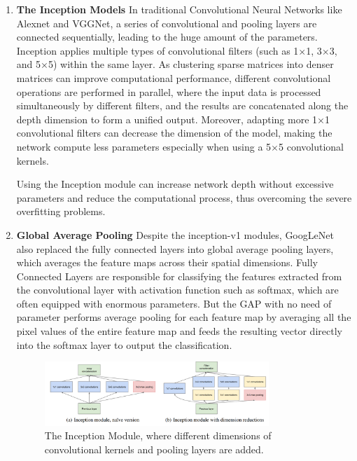 \documentclass[a4paper]{article}
\begin{document}
\begin{enumerate}
    \item \textbf{The Inception Models}
    In traditional Convolutional Neural Networks like Alexnet and VGGNet, a series of convolutional and pooling layers are connected sequentially, leading to the huge amount of the parameters. Inception applies multiple types of convolutional filters (such as 1$\times$1, 3$\times$3, and 5$\times$5) within the same layer. As clustering sparse matrices into denser matrices can improve computational performance, different convolutional operations are performed in parallel, where the input data is processed simultaneously by different filters, and the results are concatenated along the depth dimension to form a unified output. Moreover, adapting more 1$\times$1 convolutional filters can decrease the dimension of the model, making the network compute less parameters especially when using a 5$\times$5 convolutional kernels.

    Using the Inception module can increase network depth without excessive parameters and reduce the computational process, thus overcoming the severe overfitting problems.
    
    
    \item \textbf{Global Average Pooling}
    Despite the inception-v1 modules, GoogLeNet also replaced the fully connected layers into global average pooling layers, which averages the feature maps across their spatial dimensions. Fully Connected Layers are responsible for classifying the features extracted from the convolutional layer with activation function such as softmax, which are often equipped with enormous parameters. But the GAP with no need of parameter performs average pooling for each feature map by averaging all the pixel values of the entire feature map and feeds the resulting vector directly into the softmax layer to output the classification.


    \begin{figure}[ht]
    \centering
    \includegraphics[width=0.8\textwidth,height=0.25\textwidth]{images/Inception.png}
    \caption{The Inception Module, where different dimensions of convolutional kernels and pooling layers are added.\citep{DBLP:journals/corr/SzegedyLJSRAEVR14}}
\end{figure}


\end{enumerate}
\end{document}
